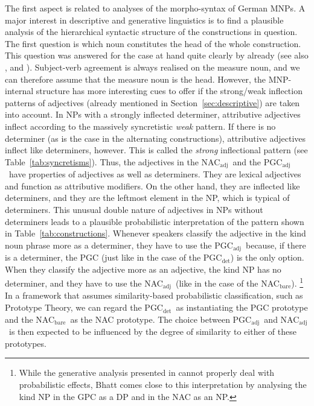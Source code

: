 \documentclass[USenglish]{article}
\newcommand{\Sub}[1]{\ensuremath{\mathrm{_{#1}}}}
\newcommand{\NACb}{NAC\Sub{bare}}
\newcommand{\NACa}{NAC\Sub{adj}}
\newcommand{\PGCd}{PGC\Sub{det}}
\newcommand{\PGCa}{PGC\Sub{adj}}
\begin{document}
The first aspect is related to analyses of the morpho-syntax of German MNPs.
A major interest in descriptive and generative linguistics is to find a plausible analysis of the hierarchical syntactic structure of the constructions in question.
The first question is which noun constitutes the head of the whole construction.
This question was answered for the case at hand quite clearly by \cite{Loebel1986} already (see also \citealp[213]{Eschenbach1994}, and \citealp[16]{GallmannLindauer1994}).
Subject-verb agreement is always realised on the measure noun, and we can therefore assume that the measure noun is the head.
However, the MNP-internal structure has more interesting cues to offer if the strong\slash weak inflection patterns of adjectives (already mentioned in Section~\ref{sec:descriptive}) are taken into account.
In NPs with a strongly inflected determiner, attributive adjectives inflect according to the massively syncretistic \textit{weak} pattern.
If there is no determiner (as is the case in the alternating constructions), attributive adjectives inflect like determiners, however.
This is called the \textit{strong} inflectional pattern (see Table~\ref{tab:syncretisms}).
Thus, the adjectives in the \NACa\ and the \PGCa\ have properties of adjectives as well as determiners.
They are lexical adjectives and function as attributive modifiers.
On the other hand, they are inflected like determiners, and they are the leftmost element in the NP, which is typical of determiners.
This unusual double nature of adjectives in NPs without determiners leads to a plausible probabilistic interpretation of the pattern shown in Table~\ref{tab:constructions}.
Whenever speakers classify the adjective in the kind noun phrase more as a determiner, they have to use the \PGCa\ because, if there is a determiner, the PGC (just like in the case of the \PGCd) is the only option.
When they classify the adjective more as an adjective, the kind NP has no determiner, and they have to use the \NACa\ (like in the case of the \NACb).%
\footnote{While the generative analysis presented in \cite{Bhatt1990} cannot properly deal with probabilistic effects, Bhatt comes close to this interpretation by analysing the kind NP in the GPC as a DP and in the NAC as an NP.}
In a framework that assumes similarity-based probabilistic classification, such as Prototype Theory, we can regard the \PGCd\ as instantiating the PGC prototype and the \NACb\ as the NAC prototype.
The choice between \PGCa\ and \NACa\ is then expected to be influenced by the degree of similarity to either of these prototypes.
\end{document}
